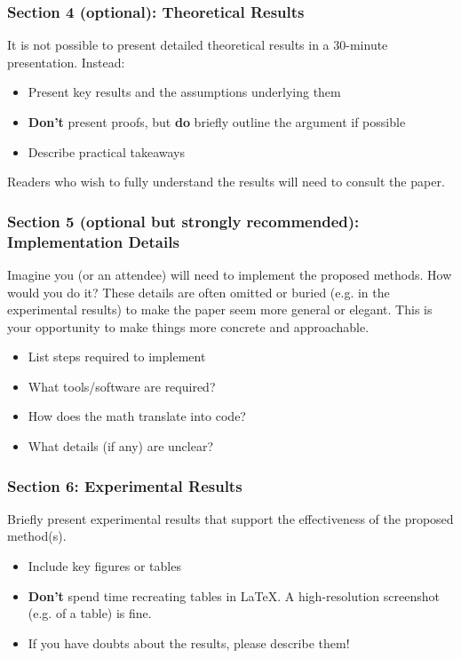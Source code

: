 \documentclass[10pt, aspectratio=169]{beamer}
\begin{document}
\begin{frame}
\frametitle{Section 4 (optional): Theoretical Results}
It is not possible to present detailed theoretical results in a 30-minute presentation. Instead:

\vspace{2em}
\begin{itemize}
    \item Present key results and the assumptions underlying them
    \item \textbf{Don't} present proofs, but \textbf{do} briefly outline the argument if possible
    \item Describe practical takeaways
\end{itemize}

\vspace{2em}
Readers who wish to fully understand the results will need to consult the paper.
\end{frame}

\begin{frame}
\frametitle{Section 5 (optional but strongly recommended): Implementation Details}
Imagine you (or an attendee) will need to implement the proposed methods. How would you do it? These details are often omitted or buried (e.g. in the experimental results) to make the paper seem more general or elegant. This is your opportunity to make things more concrete and approachable.

\vspace{2em}
\begin{itemize}
    \item List steps required to implement
    \item What tools/software are required?
    \item How does the math translate into code?
    \item What details (if any) are unclear?
\end{itemize}
\end{frame}

\begin{frame}
\frametitle{Section 6: Experimental Results}
Briefly present experimental results that support the effectiveness of the proposed method(s).

\vspace{2em}
\begin{itemize}
    \item Include key figures or tables
    \item \textbf{Don't} spend time recreating tables in \LaTeX. A high-resolution screenshot (e.g. of a table) is fine.
    \item If you have doubts about the results, please describe them!
\end{itemize}
\end{frame}
\end{document}

